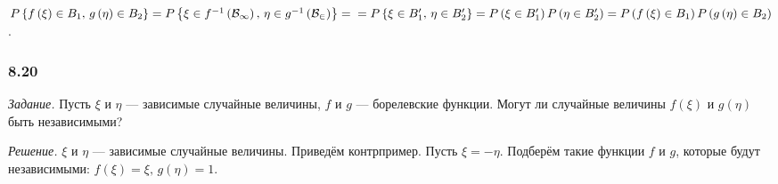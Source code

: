 $P \left\{ f \left( \xi \right) \in B_1, \, g \left( \eta \right) \in B_2 \right\} =
P \left\{ \xi \in f^{-1} \left( \mathcal{B_1} \right), \, \eta \in g^{-1} \left( \mathcal{B_2} \right) \right\} = \\
= P \left\{ \xi \in B_1', \, \eta \in B_2' \right\} =
P \left( \xi \in B_1' \right) P \left( \eta \in B_2' \right) =
P \left( f \left( \xi \right) \in B_1 \right) P \left( g \left( \eta \right) \in B_2 \right) $.

\subsubsection*{8.20}

\textit{Задание.} Пусть $ \xi $ и $ \eta $ --- зависимые случайные величины, $f$ и $g$ --- борелевские функции.
Могут ли случайные величины $f \left( \xi \right) $ и $g \left( \eta \right) $ быть независимыми?

\textit{Решение.} $ \xi $ и $ \eta $ --- зависимые случайные величины.
Приведём контрпример.
Пусть $ \xi = - \eta $.
Подберём такие функции $f$ и $g$, которые будут независимыми: $f \left( \xi \right) = \xi, \, g \left( \eta \right) = 1$.
